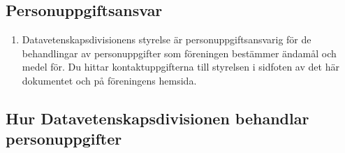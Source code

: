 \documentclass{dvd}
\begin{document}
    \subsection{Personuppgiftsansvar}

    \begin{enumerate}[label=\arabic* \S, ref=\arabic*]
        \item Datavetenskapsdivisionens styrelse är personuppgiftsansvarig för de behandlingar av personuppgifter som föreningen bestämmer ändamål och medel för.
		Du hittar kontaktuppgifterna till styrelsen i sidfoten av det här dokumentet och på föreningens hemsida.
    \end{enumerate}

    \subsection{Hur Datavetenskapsdivisionen behandlar personuppgifter}
\end{document}
